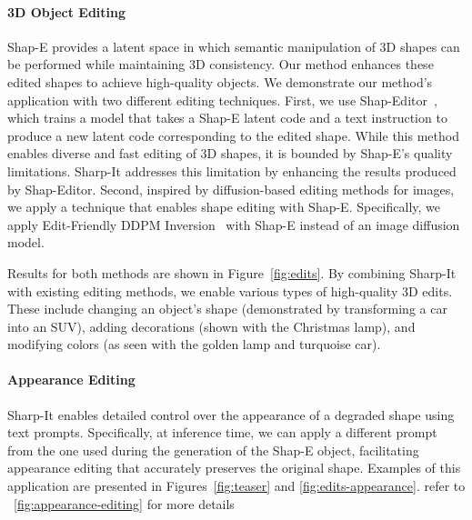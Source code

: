\vspace{-12pt}
\paragraph{3D Object Editing}



Shap-E provides a latent space in which semantic manipulation of 3D shapes can be performed while maintaining 3D consistency. Our method enhances these edited shapes to achieve high-quality objects. We demonstrate our method's application with two different editing techniques.
First, we use Shap-Editor~\cite{chen2023shapeditor}, which trains a model that takes a Shap-E latent code and a text instruction to produce a new latent code corresponding to the edited shape. While this method enables diverse and fast editing of 3D shapes, it is bounded by Shap-E's quality limitations. Sharp-It addresses this limitation by enhancing the results produced by Shap-Editor.
Second, inspired by diffusion-based editing methods for images, we apply a technique that enables shape editing with Shap-E. Specifically, we apply Edit-Friendly DDPM Inversion~\cite{huberman2024edit} with Shap-E instead of an image diffusion model.

Results for both methods are shown in Figure~\ref{fig:edits}. By combining Sharp-It with existing editing methods, we enable various types of high-quality 3D edits. These include changing an object's shape (demonstrated by transforming a car into an SUV), adding decorations (shown with the Christmas lamp), and modifying colors (as seen with the golden lamp and turquoise car).

\vspace{-16pt}
\paragraph{Appearance Editing}\label{sec:app-edit}
Sharp-It enables detailed control over the appearance of a degraded shape using text prompts. Specifically, at inference time, we can apply a different prompt from the one used during the generation of the Shap-E object, facilitating appearance editing that accurately preserves the original shape. Examples of this application are presented in Figures~\ref{fig:teaser} and \ref{fig:edits-appearance}. refer to ~\ref{fig:appearance-editing} for more details

% 


